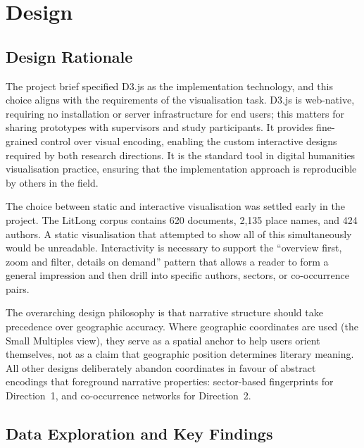 \documentclass[logo,msc]{infthesis}
\begin{document}
 
\chapter{Design}
\label{chap:design}
 
\section{Design Rationale}
 
The project brief specified D3.js as the implementation technology, and this choice aligns with the requirements of the visualisation task. D3.js is web-native, requiring no installation or server infrastructure for end users; this matters for sharing prototypes with supervisors and study participants. It provides fine-grained control over visual encoding, enabling the custom interactive designs required by both research directions. It is the standard tool in digital humanities visualisation practice, ensuring that the implementation approach is reproducible by others in the field.
 
The choice between static and interactive visualisation was settled early in the project. The LitLong corpus contains 620 documents, 2,135 place names, and 424 authors. A static visualisation that attempted to show all of this simultaneously would be unreadable. Interactivity is necessary to support the ``overview first, zoom and filter, details on demand'' pattern \cite{shneiderman1996} that allows a reader to form a general impression and then drill into specific authors, sectors, or co-occurrence pairs.
 
The overarching design philosophy is that narrative structure should take precedence over geographic accuracy. Where geographic coordinates are used (the Small Multiples view), they serve as a spatial anchor to help users orient themselves, not as a claim that geographic position determines literary meaning. All other designs deliberately abandon coordinates in favour of abstract encodings that foreground narrative properties: sector-based fingerprints for Direction~1, and co-occurrence networks for Direction~2.
 
\section{Data Exploration and Key Findings}
\label{sec:dataexploration}
 
\end{document}
